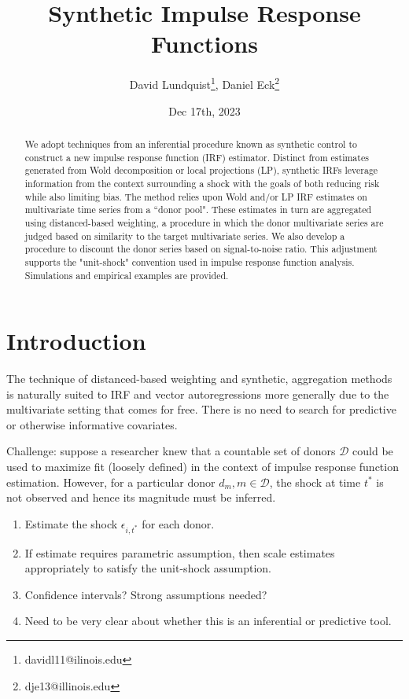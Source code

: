 \documentclass[11pt]{article}
\title{Synthetic Impulse Response Functions}
\author{David Lundquist\thanks{davidl11@ilinois.edu}, Daniel Eck\thanks{dje13@illinois.edu} }
\affil{Department of Statistics, University of Illinois at Urbana-Champaign}
\date{Dec 17th, 2023}
\theoremstyle{definition}
\begin{document}
\maketitle

\begin{abstract}
We adopt techniques from an inferential procedure known as synthetic control to construct a new impulse response function (IRF) estimator.  Distinct from estimates generated from Wold decomposition or local projections (LP), synthetic IRFs leverage information from the context surrounding a shock with the goals of both reducing risk while also limiting bias.  The method relies upon Wold and/or LP IRF estimates on multivariate time series from a ``donor pool".  These estimates in turn are aggregated using distanced-based weighting, a procedure in which the donor multivariate series are judged based on similarity to the target multivariate series.  We also develop a procedure to discount the donor series based on signal-to-noise ratio.  This adjustment supports the "unit-shock" convention used in impulse response function analysis.  Simulations and empirical examples are provided.

\end{abstract}

\section{Introduction}

The technique of distanced-based weighting and synthetic, aggregation methods is naturally suited to IRF and vector autoregressions more generally due to the multivariate setting that comes for free.  There is no need to search for predictive or otherwise informative covariates.  

Challenge: suppose a researcher knew that a countable set of donors $\mathcal{D}$ could be used to maximize fit (loosely defined) in the context of impulse response function estimation.  However, for a particular donor $d_{m}, m\in \mathcal{D}$, the shock at time $t^*$ is not observed and hence its magnitude must be inferred.

\begin{enumerate}
    \item Estimate the shock $\epsilon_{i,t^*}$ for each donor.
    \item If estimate requires parametric assumption, then scale estimates appropriately to satisfy the unit-shock assumption.
    \item Confidence intervals?  Strong assumptions needed?
    \item Need to be very clear about whether this is an inferential or predictive tool.
\end{enumerate}
\end{document}
